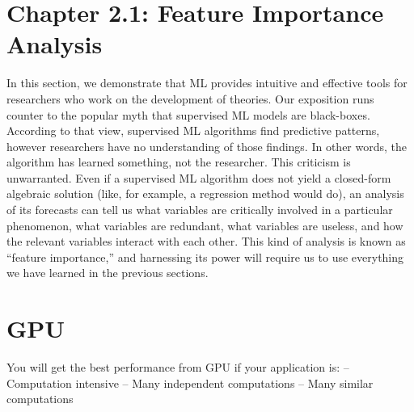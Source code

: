\documentclass[7pt]{article}
\begin{document}
\section{Chapter 2.1: Feature Importance Analysis}


In this section, we demonstrate that ML provides intuitive and effective tools for researchers who work on the development of theories. Our exposition runs counter to the popular myth that supervised ML models are black-boxes. According to that view, supervised ML algorithms find predictive patterns, however researchers have no understanding of those findings. In other words, the algorithm has learned something, not the researcher. This criticism is unwarranted.
Even if a supervised ML algorithm does not yield a closed-form algebraic solution (like, for example, a regression method would do), an analysis of its forecasts can tell us what variables are critically involved in a particular phenomenon, what variables are redundant, what variables are useless, and how the relevant variables interact with each other. This kind of analysis is known as “feature importance,” and harnessing its power will require us to use everything we have learned in the previous sections.


\section*{GPU}
You will get the best performance from GPU if your application is: – Computation intensive – Many independent computations – Many similar computations
\end{document}
